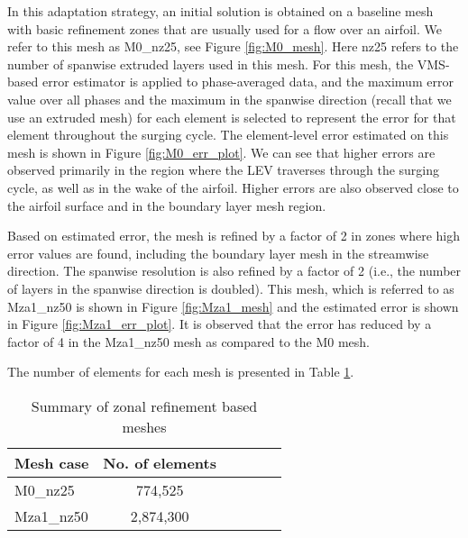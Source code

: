 In this adaptation strategy, an initial solution is obtained on a baseline mesh with basic refinement zones that are usually used for a flow over an airfoil. We refer to this mesh as M0\_nz25, see Figure \ref{fig:M0_mesh}. 
Here nz25 refers to the number of spanwise extruded layers used in this mesh. 
For this mesh, the VMS-based error estimator is applied to phase-averaged data, and the maximum error value over all phases and the maximum in the spanwise direction (recall that we use an extruded mesh) for each element is selected to represent the error for that element throughout the surging cycle. 
The element-level error estimated on this mesh is shown in Figure \ref{fig:M0_err_plot}. 
We can see that higher errors are observed primarily in the region where the LEV traverses through the surging cycle, as well as in the wake of the airfoil. 
Higher errors are also observed close to the airfoil surface and in the boundary layer mesh region.

Based on estimated error, the mesh is refined by a factor of 2 in zones where high error values are found, including the boundary layer mesh in the streamwise direction. 
The spanwise resolution is also refined by a factor of 2 (i.e., the number of layers in the spanwise direction is doubled). 
This mesh, which is referred to as Mza1\_nz50 is shown in Figure \ref{fig:Mza1_mesh} and the estimated error is shown in Figure \ref{fig:Mza1_err_plot}. 
It is observed that the error has reduced by a factor of 4 in the Mza1\_nz50 mesh as compared to the M0 mesh.


The number of elements for each mesh is presented in Table \ref{table:mesh_zonal_summary}.

\begin{table}[H]
	\centering
	\caption{Summary of zonal refinement based meshes}
	\label{table:mesh_zonal_summary}
	\begin{tabular}{|l|c|c|c|c|c|}
		\hline
		Mesh case  & No. of elements\\
		\hline
		\hline
		M0\_nz25 & 774,525 \\
		\hline
		Mza1\_nz50 &  2,874,300 \\
		\hline
	\end{tabular}
	
\end{table}

